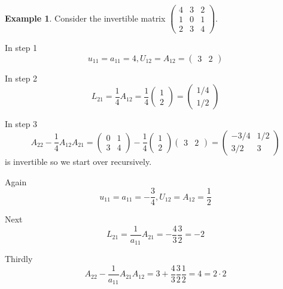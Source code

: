 \documentclass[12pt]{amsart}
\theoremstyle{definition}
\newtheorem{example}[theorem]{Example}
\begin{document}
\begin{example}\label{} Consider the invertible matrix $\left(\begin{array}{ccc} 4 & 3 & 2\\ 1 & 0 & 1\\ 2 & 3 & 4\end{array}\right)$.

In step 1
$$u_{11} = a_{11} = 4, U_{12} = A_{12} = \left(\begin{array}{cc} 3 & 2 \end{array}\right)$$

In step 2
$$L_{21} = \frac{1}{4}A_{12} = \frac{1}{4}\left(\begin{array}{c} 1 \\ 2 \end{array}\right) = \left(\begin{array}{c} 1/4 \\ 1/2 \end{array}\right)$$

In step 3
$$A_{22} - \frac{1}{4}A_{12}A_{21} = \left(\begin{array}{cc} 0 & 1\\ 3 & 4 \end{array}\right) - \frac{1}{4}\left(\begin{array}{c} 1 \\ 2 \end{array}\right)\left(\begin{array}{cc} 3 & 2 \end{array}\right) = \left(\begin{array}{cc} -3/4 & 1/2 \\ 3/2 & 3 \end{array}\right)$$
is invertible so we start over recursively.

Again
$$u_{11} = a_{11} = -\frac{3}{4}, U_{12} = A_{12} = \frac{1}{2}$$

Next
$$L_{21} = \frac{1}{a_{11}}A_{21} =  -\frac{4}{3}\frac{3}{2} = -2$$

Thirdly
$$A_{22} - \frac{1}{a_{11}}A_{21}A_{12} = 3 + \frac{4}{3}\frac{3}{2}\frac{1}{2} = 4 = 2\cdot 2$$


\end{example}
\end{document}
